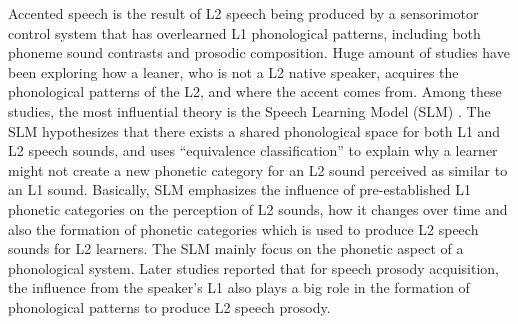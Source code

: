 Accented speech is the result of L2 speech being produced by a sensorimotor control system that has overlearned L1 phonological patterns, including both phoneme sound contrasts and prosodic composition. Huge amount of studies have been exploring how a leaner, who is not a L2 native speaker, acquires the phonological patterns of the L2, and where the accent comes from. Among these studies, the most influential theory is the Speech Learning Model (SLM) \citep{flege1995second}. The SLM hypothesizes that there exists a shared phonological space for both L1 and L2 speech sounds, and uses ``equivalence classification'' to explain why a learner might not create a new phonetic category for an L2 sound perceived as similar to an L1 sound. Basically, SLM emphasizes the influence of pre-established L1 phonetic categories on the perception of L2 sounds, how it changes over time and also the formation of phonetic categories which is used to produce L2 speech sounds for L2 learners. The SLM mainly focus on the phonetic aspect of a phonological system. Later studies reported that for speech prosody acquisition, the influence from the speaker's L1 also plays a big role in the formation of phonological patterns to produce L2 speech prosody.



